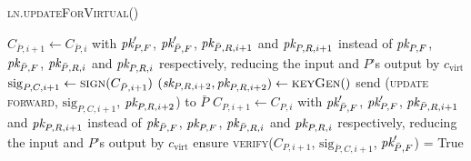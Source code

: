 \begin{center}
  \begin{processbox}{\textsc{ln}.\textsc{updateForVirtual}()}
    \begin{algorithmic}[1]
      \State $C_{\bar{P}, i+1} \gets C_{\bar{P}, i}$ with $\textit{pk}_{P, F}'$,
      $\textit{pk}_{\bar{P}, F}'$, $\textit{pk}_{\bar{P}, R, i+1}$ and $\textit{pk}_{P, R, i+1}$ instead of
      $\textit{pk}_{P, F}$, $\textit{pk}_{\bar{P}, F}$, $\textit{pk}_{\bar{P}, R, i}$ and $\textit{pk}_{P, R, i}$
      respectively, reducing the input and $P$'s output by $c_{\mathrm{virt}}$
      \State $\mathrm{sig}_{P, C, i+1} \gets \textsc{sign}(C_{\bar{P}, i+1})$
      \State $(\textit{sk}_{P, R, i+2}, \textit{pk}_{P, R, i+2}) \gets \textsc{keyGen}()$
      \State send (\textsc{update forward}, $\mathrm{sig}_{P, C, i+1}$, $\textit{pk}_{P,
      R, i+2}$) to $\bar{P}$
      \State {}
      \State {}
      \State {}
      \State {}
      \State {} 
      \State {}
      \State {}
      \State $C_{P, i+1} \gets C_{P, i}$ with $\textit{pk}_{\bar{P}, F}'$, $\textit{pk}_{P, F}'$,
      $\textit{pk}_{\bar{P}, R, i+1}$ and $\textit{pk}_{P, R, i+1}$ instead of $\textit{pk}_{\bar{P}, F}$,
      $\textit{pk}_{P, F}$, $\textit{pk}_{\bar{P}, R, i}$ and $\textit{pk}_{P, R, i}$ respectively,
      reducing the input and $P$'s output by $c_{\mathrm{virt}}$
      \State ensure \textsc{verify}($C_{P, i+1}$, $\mathrm{sig}_{\bar{P}, C,
      i+1}$, $\textit{pk}_{\bar{P}, F}'$) = True
    \end{algorithmic}
  \end{processbox}
  \label{code:ln:open:virtual-update}
\end{center} \ \\

